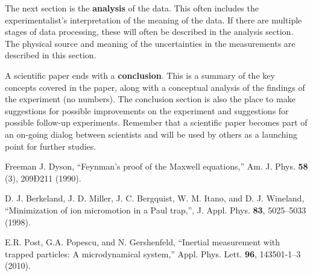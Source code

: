 \documentclass[aps,onecolumn,12pt,letterpaper,amsmath,amssymb,floatfix,pra]{revtex4-1}
\begin{document}
%

The next section is the {\bf analysis} of the data.  This often includes the experimentalist's interpretation of the meaning of the data.  If there are multiple stages of data processing, these will often be described in the analysis section.  The physical source and meaning of the uncertainties in the measurements are described in this section.


%

A scientific paper ends with a {\bf conclusion}.  This is a summary of the key concepts covered in the paper, along with a conceptual analysis of the findings of the experiment (no numbers).  The conclusion section is also the place to make suggestions for possible improvements on the experiment and suggestions for possible follow-up experiments.  Remember that a scientific paper becomes part of an on-going dialog between scientists and will be used by others as a launching point for further studies.

\begin{thebibliography}{}


  Freeman J. Dyson, ``Feynman's proof of the Maxwell equations,'' Am. J. Phys. {\bf 58} (3), 209Ð211 (1990).

 D. J. Berkeland, J. D. Miller, J. C. Bergquist, W. M. Itano, and D. J. Wineland, ``Minimization of ion micromotion in a Paul trap,'', J. Appl. Phys. {\bf 83}, 5025--5033 (1998).

 E.R. Post, G.A. Popescu, and N. Gershenfeld, ``Inertial measurement with trapped particles: A microdynamical system,'' Appl. Phys. Lett. {\bf 96}, 143501-1--3 (2010).

\end{thebibliography}
\end{document}

